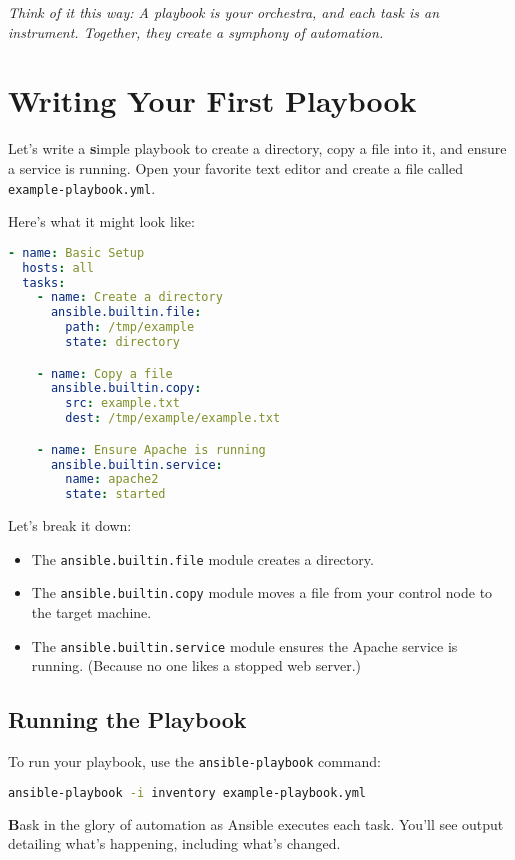 \textit{Think of it this way: A playbook is your orchestra, and each task is an instrument. Together, they create a symphony of automation.}

\section{Writing Your First Playbook}

Let's write a \textbf{s}imple playbook to create a directory, copy a file into it, and ensure a service is running. Open your favorite text editor and create a file called \texttt{example-playbook.yml}.

Here's what it might look like:
\begin{lstlisting}[language=yaml, caption=Your First Playbook]
- name: Basic Setup
  hosts: all
  tasks:
    - name: Create a directory
      ansible.builtin.file:
        path: /tmp/example
        state: directory

    - name: Copy a file
      ansible.builtin.copy:
        src: example.txt
        dest: /tmp/example/example.txt

    - name: Ensure Apache is running
      ansible.builtin.service:
        name: apache2
        state: started
\end{lstlisting}

Let's break it down:
\begin{itemize}
    \item The \texttt{ansible.builtin.file} module creates a directory.
    \item The \texttt{ansible.builtin.copy} module moves a file from your control node to the target machine.
    \item The \texttt{ansible.builtin.service} module ensures the Apache service is running. (Because no one likes a stopped web server.)
\end{itemize}

\subsection{Running the Playbook}

To run your playbook, use the \texttt{ansible-playbook} command:
\begin{lstlisting}[language=bash, caption=Running Your Playbook]
ansible-playbook -i inventory example-playbook.yml
\end{lstlisting}

\textbf{B}ask in the glory of automation as Ansible executes each task. You'll see output detailing what's happening, including what's changed.

